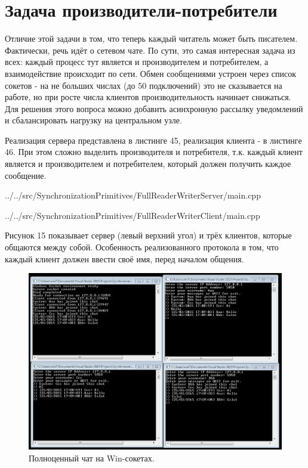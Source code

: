 \documentclass[a4paper, 12pt]{article}		%
\begin{document}
\newpage
\section{Задача производители-потребители}

Отличие этой задачи в том, что теперь каждый читатель может быть писателем. Фактически, речь идёт о сетевом чате. По сути, это самая интересная задача из всех: каждый процесс тут является и производителем и потребителем, а взаимодействие происходит по сети. Обмен сообщениями устроен через список сокетов - на не больших числах (до 50 подключений) это не сказывается на работе, но при росте числа клиентов производительность начинает снижаться. Для решения этого вопроса можно добавить асинхронную рассылку уведомлений и сбалансировать нагрузку на центральном узле.

Реализация сервера представлена в листинге 45, реализация клиента - в листинге 46. При этом сложно выделить производителя и потребителя, т.к. каждый клиент является и производителем и потребителем, который должен получить каждое сообщение.


{../../src/SynchronizationPrimitives/FullReaderWriterServer/main.cpp}


{../../src/SynchronizationPrimitives/FullReaderWriterClient/main.cpp}

Рисунок 15 показывает сервер (левый верхний угол) и трёх клиентов, которые общаются между собой. Особенность реализованного протокола в том, что каждый клиент должен ввести своё имя, перед началом общения.

\begin{figure}[h!]
\centering
\includegraphics[scale=0.7]{res/009}
\caption{Полноценный чат на Win-сокетах.}
\end{figure}
\end{document}
